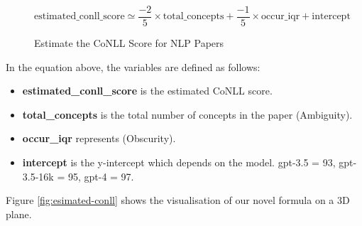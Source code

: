 \clearpage

\begin{figure}[htpb]
  \begin{equation}
      \text{estimated\_conll\_score} \simeq \frac{-2}{5} \times \text{total\_concepts} + \frac{-1}{5} \times \text{occur\_iqr} + \text{intercept}
  \end{equation}
  \caption[CoNLL Estimation]{Estimate the CoNLL Score for NLP Papers}
  \label{fig:conll-estimation}
\end{figure}

In the equation above, the variables are defined as follows:
\begin{itemize}
  \item \textbf{estimated\_conll\_score} is the estimated CoNLL score.
  \item \textbf{total\_concepts} is the total number of concepts in the paper (Ambiguity).
  \item \textbf{occur\_iqr} represents (Obscurity).
  \item \textbf{intercept} is the y-intercept which depends on the model. gpt-3.5 = 93, gpt-3.5-16k = 95, gpt-4 = 97.
\end{itemize}

Figure \ref{fig:esimated-conll} shows the visualisation of our novel formula on a 3D plane.

